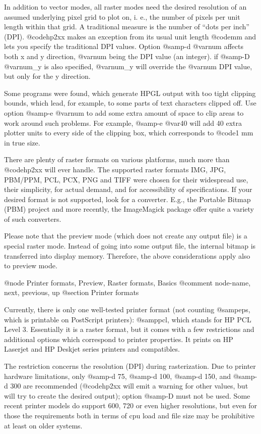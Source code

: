In addition to vector modes, all raster modes need the desired resolution
of an assumed underlying pixel grid to plot on, i. e., the number of
pixels per unit length within that grid.
A traditional measure is the number of ``dots per inch'' (DPI).
@code{hp2xx} makes an exception from its usual unit length @code{mm} and
lets you specify the traditional DPI values.
Option @samp{-d @var{num}} affects both x and y direction, @var{num} being
the DPI value (an integer). if @samp{-D @var{num_y}} is also specified,
@var{num_y} will override the @var{num} DPI value, but only for the y
direction.

Some programs were found, which generate HPGL output with too tight clipping
bounds, which lead, for example, to some parts of text characters clipped off.
Use option @samp{-e @var{num}} to add some extra amount of space to clip areas
to work around such problems. For example, @samp{-e @var{40}} will add 40 extra
plotter units to every side of the clipping box, which corresponds to @code{1 mm} 
in true size.

There are plenty of raster formats on various platforms, much more
than @code{hp2xx} will ever handle. The supported raster formats
IMG, JPG, PBM/PPM, PCL, PCX, PNG and TIFF were chosen for their widespread use, their simplicity,
for actual demand, and for accessibility of specifications.
If your desired format is not supported, look for a converter. E.g., the
Portable Bitmap (PBM) project and more recently, the ImageMagick package 
offer quite a variety of such converters.

Please note that the preview mode (which does not create any output file)
is a special raster mode. Instead of going into some output file,
the internal bitmap is transferred into display memory.
Therefore, the above considerations apply also to preview mode.




@node Printer formats, Preview, Raster formats, Basics
@comment  node-name,  next,  previous,  up
@section Printer formats

Currently, there is only one well-tested printer format (not counting @samp{eps}, which
is printable on PostScript printers): @samp{pcl}, which stands for HP PCL
Level 3. Essentially it is a raster format, but it comes with a few
restrictions and additional options which correspond to printer properties.
It prints on HP Laserjet and HP Deskjet series printers and compatibles.

The restriction concerns the resolution (DPI) during rasterization. Due to
printer hardware limitations, only @samp{-d 75}, @samp{-d 100}, @samp{-d 150},
and @samp{-d 300} are recommended (@code{hp2xx} will emit a warning for other
values, but will try to create the desired output); option @samp{-D} must not 
be used. Some recent printer models do support 600, 720 or even higher
resolutions, but even for those the requirements both in terms of cpu load
and file size may be prohibitive at least on older systems.

